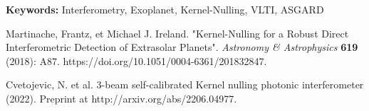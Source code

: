 \documentclass[12pt]{article}
\begin{document}
\textbf{\large Keywords:} Interferometry, Exoplanet, Kernel-Nulling, VLTI, ASGARD 

\begin{thebibliography}{60}

  Martinache, Frantz, et Michael J. Ireland. "Kernel-Nulling for a Robust Direct Interferometric Detection of Extrasolar Planets". {\it Astronomy \& Astrophysics} \textbf{619} (2018): A87. https://doi.org/10.1051/0004-6361/201832847.


 Cvetojevic, N. et al. 3-beam self-calibrated Kernel nulling photonic interferometer (2022). Preprint at http://arxiv.org/abs/2206.04977.

\end{thebibliography}
\end{document}
